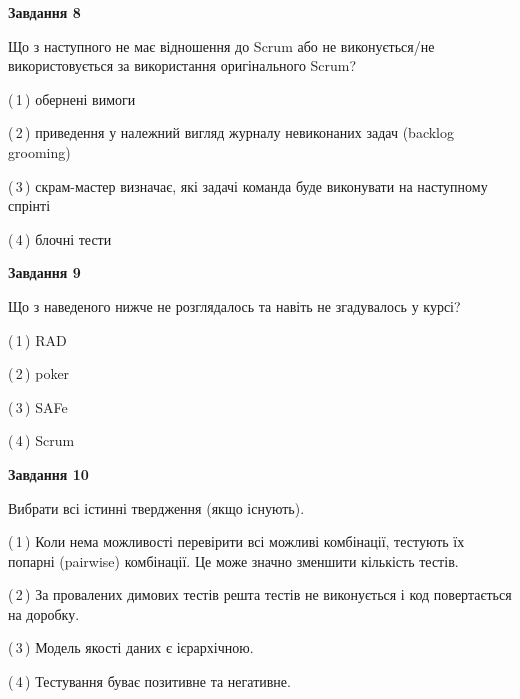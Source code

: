 \documentclass[10pt, ukrainian]{article}
\begin{document}
{\begin {large}
{\begin {center}\textbf{Завдання 8}\end {center}}\par
Що з наступного не має відношення до Scrum або не виконується/не використовується за використання оригінального Scrum?\par
\vspace{2mm}



(\,1\,) обернені вимоги%



(\,2\,) приведення у належний вигляд журналу невиконаних задач (backlog grooming) %



(\,3\,) скрам-мастер визначає, які задачі команда буде виконувати на наступному спрінті%



(\,4\,) блочні тести%


{\begin {center}\textbf{Завдання 9}\end {center}}\par
Що з наведеного нижче не розглядалось та навіть не згадувалось у курсі?\par
\vspace{2mm}



(\,1\,) RAD%



(\,2\,) poker%



(\,3\,) SAFe%



(\,4\,) Scrum%


{\begin {center}\textbf{Завдання 10}\end {center}}\par
Вибрати всі істинні твердження (якщо існують).\par
\vspace{2mm}



(\,1\,) Коли нема можливості перевірити всі можливі комбінації, тестують їх попарні (pairwise) комбінації. Це може значно зменшити кількість тестів.%



(\,2\,) За провалених димових тестів решта тестів не виконується і код повертається на доробку.%



(\,3\,) Модель якості даних є ієрархічною.%



(\,4\,) Тестування буває позитивне та негативне.%



\end {large}}
\end{document}
